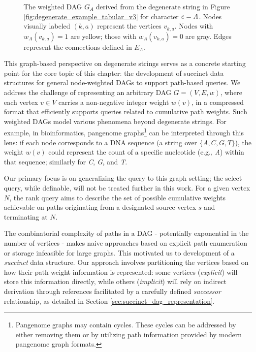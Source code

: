 \begin{figure}[htbp]
    \caption{The weighted DAG $G_A$ derived from the degenerate string in Figure \ref{fig:degenerate_example_tabular_v3} for character $c=\emph{A}$. Nodes visually labeled $(k,a)$ represent the vertices $v_{k,a}$. Nodes with $w_A(v_{k,a})=1$ are yellow; those with $w_A(v_{k,a})=0$ are gray. Edges represent the connections defined in $E_A$.}
    \label{fig:degenerate_dag_horizontal_v3}
\end{figure}

This graph-based perspective on degenerate strings serves as a concrete starting point for the core topic of this chapter: the development of succinct data structures for general node-weighted DAGs to support path-based queries. We address the challenge of representing an arbitrary DAG $G=(V, E, w)$, where each vertex $v \in V$ carries a non-negative integer weight $w(v)$, in a compressed format that efficiently supports queries related to cumulative path weights. Such weighted DAGs model various phenomena beyond degenerate strings. For example, in bioinformatics, pangenome graphs\footnote{Pangenome graphs may contain cycles. These cycles can be addressed by either removing them or by utilizing path information provided by modern pangenome graph formats.} can be interpreted through this lens: if each node corresponds to a DNA sequence (a string over $\{A, C, G, T\}$), the weight $w(v)$ could represent the count of a specific nucleotide (e.g., \emph{A}) within that sequence; similarly for \emph{C}, \emph{G}, and \emph{T}.

Our primary focus is on generalizing the \Rank{} query to this graph setting; the \textsf{select} query, while definable, will not be treated further in this work. For a given vertex $N$, the \textsf{rank} query aims to describe the set of possible cumulative weights achievable on paths originating from a designated source vertex $s$ and terminating at $N$.

The combinatorial complexity of paths in a DAG - potentially exponential in the number of vertices - makes naive approaches based on explicit path enumeration or storage infeasible for large graphs. This motivated us to development of a \emph{succinct} data structure. Our approach involves partitioning the vertices based on how their path weight information is represented: some vertices (\emph{explicit}) will store this information directly, while others (\emph{implicit}) will rely on indirect derivation through references facilitated by a carefully defined \emph{successor} relationship, as detailed in Section \ref{sec:succinct_dag_representation}.
